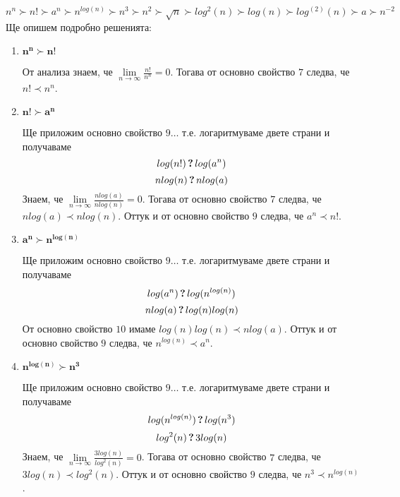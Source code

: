 \begin{solution}
	\leavevmode\newline
	$n^n\succ n!\succ a^n\succ n^{log(n)}\succ n^3\succ n^2\succ\sqrt n\succ log^2(n)\succ log(n)\succ log^{(2)}(n)\succ a\succ n^{-2}$\\
	Ще опишем подробно решенията:
	\begin{enumerate}[label=\textbf{\arabic*.}]
		\item $\bm{n^n\succ n!}$
		
		От анализа знаем, че $\lim\limits_{n\to\infty}\frac{n!}{n^n}=0$. Тогава от основно свойство $\hyperref[mprop-1]{7}$ следва, че $n!\prec n^n$.
		
		
		\vspace{0.2cm}
		\item $\bm{n!\succ a^n}$
		
		Ще приложим основно свойство $\hyperref[mprop-1]{9}\dots$ т.е. логаритмуваме двете страни и получаваме
		\begin{equation*}
			log(n!)\,\textbf?\,log(a^n)
		\end{equation*}
		\begin{equation*}
			nlog(n)\,\textbf?\,nlog(a)
		\end{equation*}
		Знаем, че $\lim\limits_{n\to\infty}\frac{nlog(a)}{nlog(n)}=0$. Тогава от основно свойство $\hyperref[mprop-1]{7}$ следва, че $nlog(a)\prec nlog(n)$. Оттук и от основно свойство $\hyperref[mprop-1]{9}$ следва, че $a^n\prec n!$.
		
		
		\vspace{0.2cm}
		\item $\bm{a^n\succ n^{log(n)}}$
		
		Ще приложим основно свойство $\hyperref[mprop-1]{9}\dots$ т.е. логаритмуваме двете страни и получаваме
		\begin{equation*}
			log(a^n)\,\textbf?\,log(n^{log(n)})
		\end{equation*}
		\begin{equation*}
			nlog(a)\,\textbf?\,log(n)log(n)
		\end{equation*}
		От основно свойство $\hyperref[mprop-1]{10}$ имаме $log(n)log(n)\prec nlog(a)$. Оттук и от основно свойство $\hyperref[mprop-1]{9}$ следва, че $n^{log(n)}\prec a^n$.
		
		
		\vspace{0.2cm}
		\item $\bm{n^{log(n)}\succ n^3}$
		
		Ще приложим основно свойство $\hyperref[mprop-1]{9}\dots$ т.е. логаритмуваме двете страни и получаваме
		\begin{equation*}
			log(n^{log(n)})\,\textbf?\,log(n^3)
		\end{equation*}
		\begin{equation*}
			log^2(n)\,\textbf?\,3log(n)
		\end{equation*}
		Знаем, че $\lim\limits_{n\to\infty}\frac{3log(n)}{log^2(n)}=0$. Тогава от основно свойство $\hyperref[mprop-1]{7}$ следва, че $3log(n)\prec log^2(n)$. Оттук и от основно свойство $\hyperref[mprop-1]{9}$ следва, че $n^3\prec n^{log(n)}$.
		

\end{enumerate}
\end{solution}
